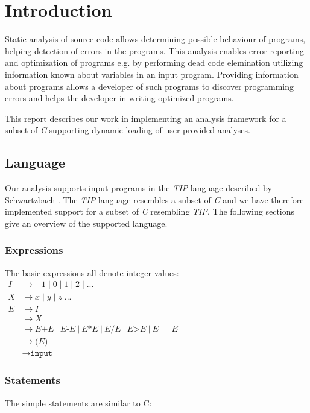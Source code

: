 \section{Introduction}

Static analysis of source code allows determining possible behaviour of programs, helping detection of errors in the programs. This analysis enables error reporting and optimization of programs e.g. by performing dead code elemination utilizing information known about variables in an input program. Providing information about programs allows a developer of such programs to discover programming errors and helps the developer in writing optimized programs.  

\newpar This report describes our work in implementing an analysis framework for a subset of \textit{C} supporting dynamic loading of user-provided analyses. 

\subsection{Language}

\newpar Our analysis supports input programs in the \textit{TIP} language described by Schwartzbach \cite{spa}. The \textit{TIP} language resembles a subset of \textit{C} and we have therefore implemented support for a subset of \textit{C} resembling \textit{TIP}. The following sections give an overview of the supported language.

\subsubsection{Expressions}
The basic expressions all denote integer values: \\

$
\begin{aligned}
    I & \rightarrow -1\;|\;0\;|\;1\;|\;2\;|\;... \\
    X & \rightarrow x\;|\;y\;|\;z\;... \\
    E & \rightarrow { I } \\
    & \rightarrow { X } \\ 
    & \rightarrow E\texttt{+}E\:|\:E\texttt{-}E\:|\:E \texttt{*} E\:|\:E \texttt{/} E\:|\:E\texttt{>}E\:|\:E\texttt{==}E \\ 
    & \rightarrow\texttt{(}E\texttt{)} \\
    & \rightarrow\texttt{input} 
\end{aligned}
$


\subsubsection{Statements}
The simple statements are similar to C: \\

